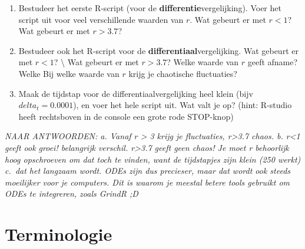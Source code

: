 \documentclass[
  a4paper,
]{scrbook}
\providecommand{\tightlist}{%
  \setlength{\itemsep}{0pt}\setlength{\parskip}{0pt}}\usepackage{longtable,booktabs,array}
\theoremstyle{definition}
\theoremstyle{remark}
\begin{document}
\begin{enumerate}
\def\labelenumi{\alph{enumi}.}
\tightlist
\item
  Bestudeer het eerste R-script (voor de
  \textbf{differentie}vergelijking). Voer het script uit voor veel
  verschillende waarden van \(r\). Wat gebeurt er met \(r<1\)? Wat
  gebeurt er met \(r>3.7\)?
\item
  Bestudeer ook het R-script voor de \textbf{differentiaal}vergelijking.
  Wat gebeurt er met \(r<1\)? \textbackslash{} Wat gebeurt er met
  \(r>3.7\)? Welke waarde van \(r\) geeft afname? Welke Bij welke waarde
  van \(r\) krijg je chaotische fluctuaties?
\item
  Maak de tijdstap voor de differentiaalvergelijking heel klein (bijv
  \(delta_t = 0.0001\)), en voer het hele script uit. Wat valt je op?
  (hint: R-studio heeft rechtsboven in de console een grote rode
  STOP-knop)
\end{enumerate}

\emph{NAAR ANTWOORDEN: a. Vanaf r \textgreater{} 3 krijg je fluctuaties,
r\textgreater3.7 chaos. b. r\textless1 geeft ook groei! belangrijk
verschil. r\textgreater3.7 geeft geen chaos! Je moet r behoorlijk hoog
opschroeven om dat toch te vinden, want de tijdstapjes zijn klein (250
werkt) c.~dat het langzaam wordt. ODEs zijn dus precieser, maar dat
wordt ook steeds moeilijker voor je computers. Dit is waarom je meestal
betere tools gebruikt om ODEs te integreren, zoals GrindR ;D}

\hypertarget{terminologie-2}{%
\section{Terminologie}\label{terminologie-2}}
\end{document}
